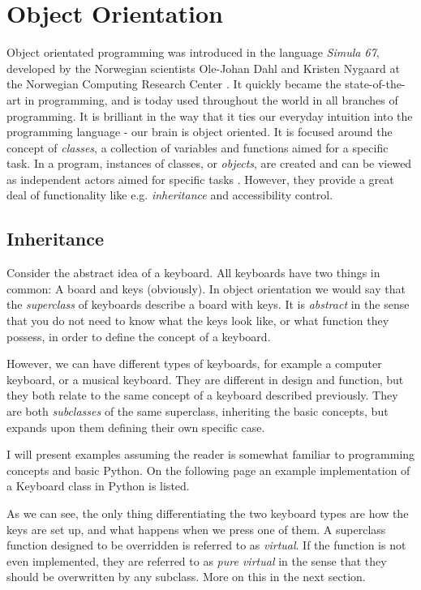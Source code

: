 \section{Object Orientation}
\label{sec:OO}

Object orientated programming was introduced in the language \textit{Simula 67}, developed by the Norwegian scientists Ole-Johan Dahl and Kristen Nygaard at the Norwegian Computing Research Center \cite{ORegan}. It quickly became the state-of-the-art in programming, and is today used throughout the world in all branches of programming. It is brilliant in the way that it ties our everyday intuition into the programming language - our brain is object oriented. It is focused around the concept of \textit{classes}, a collection of variables and functions aimed for a specific task. In a program, instances of classes, or \textit{objects}, are created and can be viewed as independent actors aimed for specific tasks \cite{inf1100, inf3331, ORegan}. However, they provide a great deal of functionality like e.g. \textit{inheritance} and accessibility control. 

\subsection{Inheritance}

Consider the abstract idea of a keyboard. All keyboards have two things in common: A board and keys (obviously). In object orientation we would say that the \textit{superclass} of keyboards describe a board with keys. It is \textit{abstract} in the sense that you do not need to know what the keys look like, or what function they possess, in order to define the concept of a keyboard.

However, we can have different types of keyboards, for example a computer keyboard, or a musical keyboard. They are different in design and function, but they both relate to the same concept of a keyboard described previously. They are both \textit{subclasses} of the same superclass, inheriting the basic concepts, but expands upon them defining their own specific case. 

I will present examples assuming the reader is somewhat familiar to programming concepts and basic Python. On the following page an example implementation of a Keyboard class in Python is listed.

\newpage


As we can see, the only thing differentiating the two keyboard types are how the keys are set up, and what happens when we press one of them. A superclass function designed to be overridden is referred to as \textit{virtual}. If the function is not even implemented, they are referred to as \textit{pure virtual} in the sense that they should be overwritten by any subclass. More on this in the next section.

